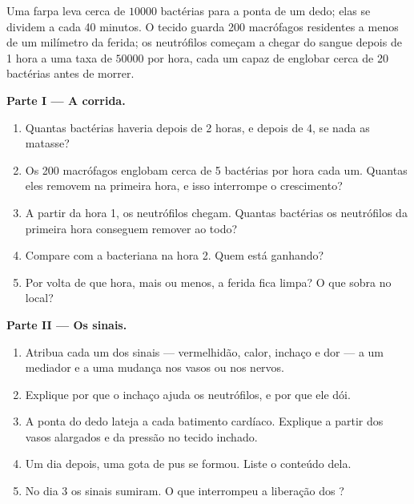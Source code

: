 \begin{problem}
\label{pb:g12:innate-immunity:1}
Uma farpa leva cerca de $\num{10000}$ bactérias para a ponta de um
dedo; elas se dividem a cada 40 minutos. O tecido guarda 200 macrófagos
residentes a menos de um milímetro da ferida; os neutrófilos começam a
chegar do sangue depois de 1 hora a uma taxa de $\num{50000}$ por hora,
cada um capaz de englobar cerca de 20 bactérias antes de morrer.

\medskip
\noindent\textbf{Parte I --- A corrida.}
\begin{enumerate}
  \item Quantas bactérias haveria depois de 2 horas, e depois de 4, se
        nada as matasse?
  \item Os 200 macrófagos englobam cerca de 5 bactérias por hora cada
        um. Quantas eles removem na primeira hora, e isso interrompe o
        crescimento?
  \item A partir da hora 1, os neutrófilos chegam. Quantas bactérias os
        neutrófilos da primeira hora conseguem remover ao todo?
  \item Compare com a  bacteriana na hora 2. Quem está ganhando?
  \item Por volta de que hora, mais ou menos, a ferida fica limpa? O
        que sobra no local?
\end{enumerate}

\medskip
\noindent\textbf{Parte II --- Os sinais.}
\begin{enumerate}[resume]
  \item Atribua cada um dos sinais --- vermelhidão, calor, inchaço e
        dor --- a um mediador e a uma mudança nos vasos ou nos nervos.
  \item Explique por que o inchaço ajuda os neutrófilos, e por que ele dói.
  \item A ponta do dedo lateja a cada batimento cardíaco. Explique a
        partir dos vasos alargados e da pressão no tecido inchado.
  \item Um dia depois, uma gota de pus se formou. Liste o conteúdo dela.
  \item No dia 3 os sinais sumiram. O que interrompeu a liberação dos
        ?
\end{enumerate}


\end{problem}
